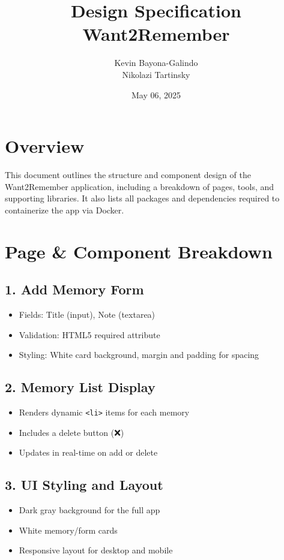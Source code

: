 \documentclass[12pt]{article}
\title{\Huge Design Specification\\[0.5em]\LARGE Want2Remember}
\author{Kevin Bayona-Galindo \\ Nikolazi Tartinsky}
\date{May 06, 2025}
\begin{document}
\maketitle
\tableofcontents
\newpage

\section{Overview}
This document outlines the structure and component design of the Want2Remember application, including a breakdown of pages, tools, and supporting libraries. It also lists all packages and dependencies required to containerize the app via Docker.

\section{Page & Component Breakdown}

\subsection*{1. Add Memory Form}
\begin{itemize}
  \item Fields: Title (input), Note (textarea)
  \item Validation: HTML5 required attribute
  \item Styling: White card background, margin and padding for spacing
\end{itemize}

\subsection*{2. Memory List Display}
\begin{itemize}
  \item Renders dynamic \texttt{<li>} items for each memory
  \item Includes a delete button (❌)
  \item Updates in real-time on add or delete
\end{itemize}

\subsection*{3. UI Styling and Layout}
\begin{itemize}
  \item Dark gray background for the full app
  \item White memory/form cards
  \item Responsive layout for desktop and mobile
\end{itemize}
\end{document}
